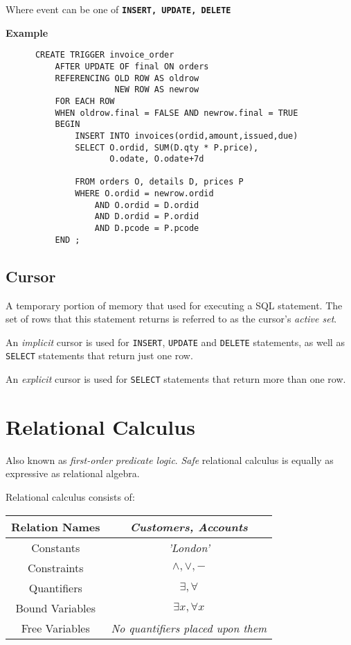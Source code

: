 \documentclass{article}
\begin{document}
Where event can be one of \texttt{\textbf{INSERT, UPDATE, DELETE}}

\textbf{Example}
\begin{lstlisting}
      CREATE TRIGGER invoice_order
          AFTER UPDATE OF final ON orders
          REFERENCING OLD ROW AS oldrow
                      NEW ROW AS newrow
          FOR EACH ROW
          WHEN oldrow.final = FALSE AND newrow.final = TRUE
          BEGIN
              INSERT INTO invoices(ordid,amount,issued,due)
              SELECT O.ordid, SUM(D.qty * P.price),
                     O.odate, O.odate+7d

              FROM orders O, details D, prices P
              WHERE O.ordid = newrow.ordid
                  AND O.ordid = D.ordid
                  AND D.ordid = P.ordid
                  AND D.pcode = P.pcode
          END ;
    \end{lstlisting}


\subsection{Cursor}

A temporary portion of memory that used for executing a SQL statement. The set of rows that this statement returns is referred to as the cursor's \textit{active set}.

An \textit{implicit} cursor is used for \texttt{INSERT}, \texttt{UPDATE} and \texttt{DELETE} statements, as well as \texttt{SELECT} statements that return just one row.

An \textit{explicit} cursor is used for \texttt{SELECT} statements that return more than one row.

\section{Relational Calculus}

Also known as \textit{first-order predicate logic}. \textit{Safe} relational calculus is equally as expressive as relational algebra.

Relational calculus consists of:

\begin{center}
  \begin{tabular}{|c|c|}
    \hline
    Relation Names  & \textit{Customers, Accounts}             \\
    \hline
    Constants       & \textit{'London'}                        \\
    \hline
    Constraints     & $\wedge, \vee, -$                        \\
    \hline
    Quantifiers     & $\exists, \forall$                       \\
    \hline
    Bound Variables & $\exists x, \forall x$                   \\
    \hline
    Free Variables  & \textit{No quantifiers placed upon them} \\
    \hline
  \end{tabular}
\end{center}
\end{document}
